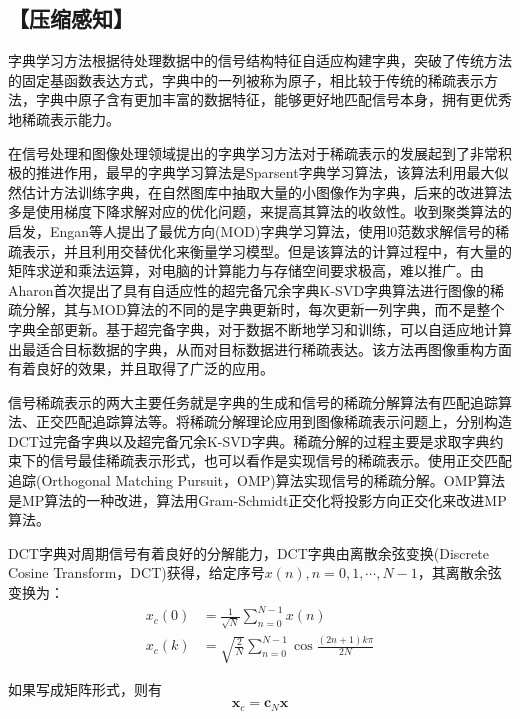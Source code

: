 \documentclass[11pt]{article}
\newcommand{\kai}{\CJKfamily{kai}}
\begin{document}
\subsection*{\kai\fontsize{11pt}{10pt} \selectfont【压缩感知】}
字典学习方法根据待处理数据中的信号结构特征自适应构建字典，突破了传统方法的固定基函数表达方式，字典中的一列被称为原子，相比较于传统的稀疏表示方法，字典中原子含有更加丰富的数据特征，能够更好地匹配信号本身，拥有更优秀地稀疏表示能力。
\par
在信号处理和图像处理领域提出的字典学习方法对于稀疏表示的发展起到了非常积极的推进作用，最早的字典学习算法是Sparsent字典学习算法，该算法利用最大似然估计方法训练字典，在自然图库中抽取大量的小图像作为字典，后来的改进算法多是使用梯度下降求解对应的优化问题，来提高其算法的收敛性。收到聚类算法的启发，Engan等人提出了最优方向(MOD)字典学习算法，使用l0范数求解信号的稀疏表示，并且利用交替优化来衡量学习模型。但是该算法的计算过程中，有大量的矩阵求逆和乘法运算，对电脑的计算能力与存储空间要求极高，难以推广。由Aharon首次提出了具有自适应性的超完备冗余字典K-SVD字典算法进行图像的稀疏分解，其与MOD算法的不同的是字典更新时，每次更新一列字典，而不是整个字典全部更新。基于超完备字典，对于数据不断地学习和训练，可以自适应地计算出最适合目标数据的字典，从而对目标数据进行稀疏表达。该方法再图像重构方面有着良好的效果，并且取得了广泛的应用。
\par
信号稀疏表示的两大主要任务就是字典的生成和信号的稀疏分解算法有匹配追踪算法、正交匹配追踪算法等。将稀疏分解理论应用到图像稀疏表示问题上，分别构造DCT过完备字典以及超完备冗余K-SVD字典。稀疏分解的过程主要是求取字典约束下的信号最佳稀疏表示形式，也可以看作是实现信号的稀疏表示。使用正交匹配追踪(Orthogonal Matching Pursuit，OMP)算法实现信号的稀疏分解。OMP算法是MP算法的一种改进，算法用Gram-Schmidt正交化将投影方向正交化来改进MP算法。
\par
DCT字典对周期信号有着良好的分解能力，DCT字典由离散余弦变换(Discrete Cosine Transform，DCT)获得，给定序号$x(n),n=0,1,\cdots,N-1$，其离散余弦变换为：
\begin{equation}\label{DCT_}
\begin{aligned}
x_c(0)&=\frac{1}{\sqrt{N}}\sum_{n=0}^{N-1} x(n)\\
x_c(k)&=\sqrt{\frac{2}{N}}\sum_{n=0}^{N-1} \cos \frac{(2n+1)k\pi}{2N}
\end{aligned}
\end{equation}
\par
如果写成矩阵形式，则有
\begin{equation}\label{DCTArray}
\mathbf{x}_c=\mathbf{c}_N \mathbf{x}
\end{equation}
\end{document}
